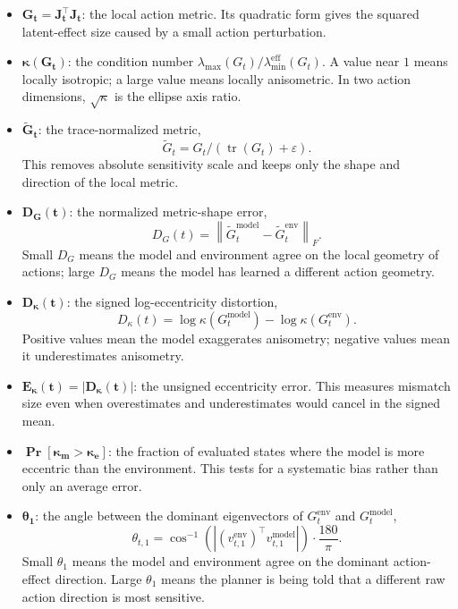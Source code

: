 ﻿\documentclass{article}
\begin{document}
\begin{itemize}
  \item \(\boldsymbol{G_t=J_t^\top J_t}\): the local action metric.  Its
  quadratic form gives the squared latent-effect size caused by a small action
  perturbation.
  \item \(\boldsymbol{\kappa(G_t)}\): the condition number
  \(\lambda_{\max}(G_t)/\lambda_{\min}^{\mathrm{eff}}(G_t)\).  A value near
  \(1\) means locally isotropic; a large value means locally anisometric.  In
  two action dimensions, \(\sqrt{\kappa}\) is the ellipse axis ratio.
  \item \(\boldsymbol{\widetilde G_t}\): the trace-normalized metric,
  \[
  \widetilde G_t =
  G_t/(\operatorname{tr}(G_t)+\varepsilon).
  \]
  This removes absolute sensitivity scale and keeps only the shape and
  direction of the local metric.
  \item \(\boldsymbol{D_G(t)}\): the normalized metric-shape error,
  \[
  D_G(t)=
  \left\|
  \widetilde G^{\mathrm{model}}_t
  -
  \widetilde G^{\mathrm{env}}_t
  \right\|_F .
  \]
  Small \(D_G\) means the model and environment agree on the local geometry of
  actions; large \(D_G\) means the model has learned a different action
  geometry.
  \item \(\boldsymbol{D_\kappa(t)}\): the signed log-eccentricity distortion,
  \[
  D_\kappa(t)=
  \log \kappa(G^{\mathrm{model}}_t)
  -
  \log \kappa(G^{\mathrm{env}}_t).
  \]
  Positive values mean the model exaggerates anisometry; negative values mean
  it underestimates anisometry.
  \item \(\boldsymbol{E_\kappa(t)=|D_\kappa(t)|}\): the unsigned eccentricity
  error.  This measures mismatch size even when overestimates and
  underestimates would cancel in the signed mean.
  \item \(\boldsymbol{\Pr[\kappa_m>\kappa_e]}\): the fraction of evaluated
  states where the model is more eccentric than the environment.  This tests
  for a systematic bias rather than only an average error.
  \item \(\boldsymbol{\theta_1}\): the angle between the dominant eigenvectors
  of \(G^{\mathrm{env}}_t\) and \(G^{\mathrm{model}}_t\),
  \[
  \theta_{t,1}
  =
  \cos^{-1}
  \left(
  \left|
  \left(v^{\mathrm{env}}_{t,1}\right)^\top
  v^{\mathrm{model}}_{t,1}
  \right|
  \right)
  \cdot
  \frac{180}{\pi}.
  \]
  Small \(\theta_1\) means the model and environment agree on the dominant
  action-effect direction.  Large \(\theta_1\) means the planner is being told
  that a different raw action direction is most sensitive.

\end{itemize}
\end{document}
